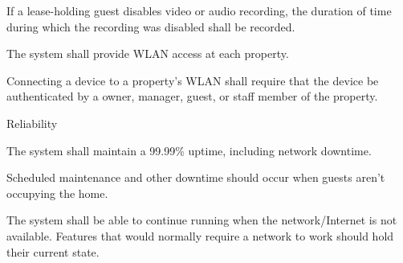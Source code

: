 \documentclass[letter,titlepage,oneside,english]{report}
\begin{document}
\begin{fr}
\begin{fr}
\begin{fr}
    \item
      If a lease-holding guest disables video or audio recording, the duration of time during which the recording was disabled shall be recorded.
    \end{fr}
  \end{fr}
\item
  The system shall provide WLAN access at each property.
  \begin{fr}
  \item
    Connecting a device to a property's WLAN shall require that the device be authenticated by a owner, manager, guest, or staff member of the property.
  \end{fr}
\end{fr}

\begin{nfr}
\item
	Reliability
	\begin{nfr}
	\item 
		The system shall maintain a 99.99\% uptime, including network downtime.
		\begin{nfr}
		\item 
			Scheduled maintenance and other downtime should occur when guests aren't occupying the home.
		\end{nfr}
	\item 
		The system shall be able to continue running when the network/Internet is not available. Features that would normally require a network to work should hold their current state.
	\item 
	

\end{nfr}
\end{nfr}
\end{document}
